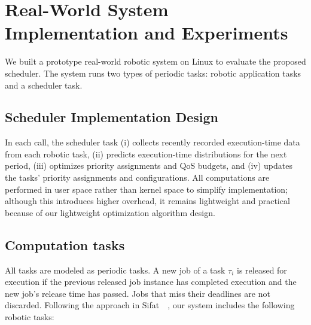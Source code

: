 
    \section{Real-World System Implementation and Experiments}
    We built a prototype real-world robotic system on Linux to evaluate the proposed scheduler.
    The system runs two types of periodic tasks: robotic application tasks and a scheduler task.

    \subsection{Scheduler Implementation Design}
    In each call, the scheduler task (i) collects recently recorded execution-time data from each robotic task, 
	(ii) predicts execution-time distributions for the next period, 
	(iii) optimizes priority assignments and QoS budgets, and (iv) updates the tasks' priority assignments and configurations.
    All computations are performed in user space rather than kernel space to simplify implementation; although this introduces higher overhead, it remains lightweight and practical because of our lightweight optimization algorithm design.
    

    \subsection{Computation tasks}
    \label{section_computation_tasks}
    All tasks are modeled as periodic tasks.
    A new job of a task $\tau_i$ is released for execution if the previous released job instance has completed execution and the new job's release time has passed.
    Jobs that miss their deadlines are not discarded.
    Following the approach in Sifat~\etal~\cite{Ash23RAL}, our system includes the following robotic tasks:

